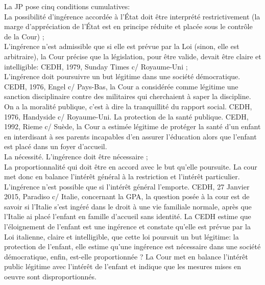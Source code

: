\documentclass[10pt, a4paper, openany]{book}
\begin{document}
La JP pose cinq conditions cumulatives: \\
La possibilité d'ingérence accordée à l'État doit être interprété restrictivement (la marge d'appréciation de l'État est en principe réduite et placée sous le contrôle de la Cour) ; \\
L'ingérence n'est admissible que si elle est prévue par la Loi (sinon, elle est arbitraire), la Cour précise que la législation, pour être valide, devait être claire et intelligible: CEDH, 1979, Sunday Times c/ Royaume-Uni ; \\
L'ingérence doit poursuivre un but légitime dans une société démocratique. CEDH, 1976, Engel c/ Pays-Bas, la Cour a considérée comme légitime une sanction disciplinaire contre des militaires qui cherchaient à saper la discipline. On a la moralité publique, c'est à dire la tranquillité du rapport social. CEDH, 1976, Handyside c/ Royaume-Uni. La protection de la santé publique. CEDH, 1992, Rieme c/ Suède, la Cour a estimée légitime de protéger la santé d'un enfant en interdisant à ses parents incapables d'en assurer l'éducation alors que l'enfant est placé dans un foyer d'accueil. \\
La nécessité. L'ingérence doit être nécessaire ; \\
La proportionnalité qui doit être en accord avec le but qu'elle poursuite. La cour met donc en balance l'intérêt général à la restriction et l'intérêt particulier. L'ingérence n'est possible que si l'intérêt général l'emporte. CEDH, 27 Janvier 2015, Paradiso c/ Italie, concernant la GPA, la question posée à la cour est de savoir si l'Italie s'est ingéré dans le droit à une vie familiale normale, après que l'Italie ai placé l'enfant en famille d'accueil sans identité. La CEDH estime que l'éloignement de l'enfant est une ingérence et constate qu'elle est prévue par la Loi italienne, claire et intelligible, que cette loi poursuit un but légitime: la protection de l'enfant, elle estime qu'une ingérence est nécessaire dans une société démocratique, enfin, est-elle proportionnée ? La Cour met en balance l'intérêt public légitime avec l'intérêt de l'enfant et indique que les mesures mises en oeuvre sont disproportionnés. 
\end{document}
